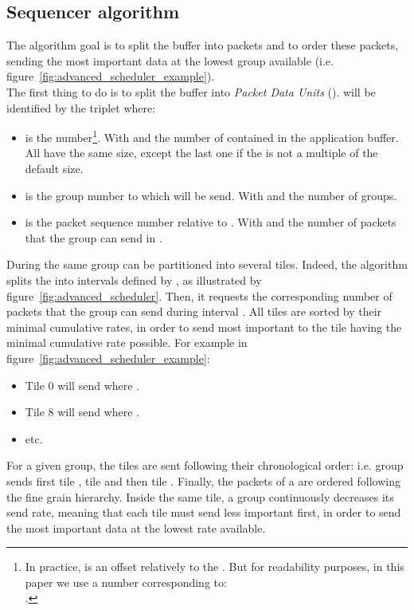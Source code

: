 \documentclass[a4paper]{article}
\begin{document}
    \subsection{Sequencer algorithm}
        The algorithm goal is to split the buffer into packets and to order
        these packets, sending the most important data at the lowest group
        available (i.e.  figure~\ref{fig:advanced_scheduler_example}).
        \\
        The first thing to do is to split the buffer into \textit{Packet Data
            Units} ().   will be identified by the triplet  where:
        \begin{itemize}
            \item{
                 is the  number\footnote{
                        In practice,  is an offset relatively to the
                            . But for readability purposes, in this
                            paper we use a  number corresponding to:
                            \\
                            .
                    }.
                    With  and  the number of 
                        contained in the application buffer. All  have
                        the same size, except the last one if the
                         is not a multiple of the default 
                        size.
            }
            \item{
                 is the group number to which  will be send. With  and  the number of groups.
            }
            \item{
                 is the packet sequence number relative to .  With  and  the number of packets that
                    the group  can send in .
            }
        \end{itemize}
        During  the same group can be partitioned into several
        tiles.  Indeed, the algorithm splits the  into intervals
        defined by , as illustrated by
        figure~\ref{fig:advanced_scheduler}.  Then, it requests the
        corresponding number of packets  that the group  can send
        during interval .  All tiles are sorted by their minimal cumulative
        rates, in order to send most important  to the tile having the
        minimal cumulative rate possible. For example in
        figure~\ref{fig:advanced_scheduler_example}:
        \begin{itemize}
            \item{
                Tile 0 will send  where .
            }
            \item{
                Tile 8 will send  where .
            }
            \item{
                etc.
            }
        \end{itemize}
        For a given group, the tiles are sent following their chronological
        order: i.e. group  sends first tile , tile  and then tile .
        Finally, the packets of a  are ordered following the fine grain
        hierarchy.  Inside the same tile, a group continuously decreases its
        send rate, meaning that each tile must send less important  first,
        in order to send the most important data at the lowest rate available.
\end{document}
